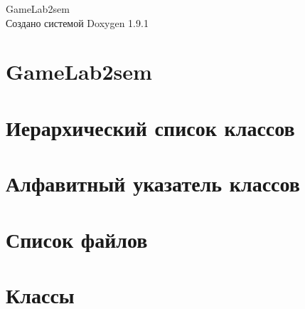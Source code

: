 \let\mypdfximage\pdfximage\def\pdfximage{\immediate\mypdfximage}\documentclass[twoside]{book}
\newcommand{\+}{\discretionary{\mbox{\scriptsize$\hookleftarrow$}}{}{}}
\newcommand{\clearemptydoublepage}{%
  \newpage{\pagestyle{empty}\cleardoublepage}%
}
\begin{document}
\raggedbottom

\hypersetup{pageanchor=false,
             bookmarksnumbered=true,
             pdfencoding=unicode
            }
\begin{titlepage}
\vspace*{7cm}
\begin{center}%
{\Large Game\+Lab2sem }\\
\vspace*{1cm}
{\large Создано системой Doxygen 1.9.1}\\
\end{center}
\end{titlepage}
\clearemptydoublepage
{}
\tableofcontents
\clearemptydoublepage
{}
\hypersetup{pageanchor=true}

\chapter{Game\+Lab2sem}
\label{index}\hypertarget{index}{}
\chapter{Иерархический список классов}

\chapter{Алфавитный указатель классов}

\chapter{Список файлов}

\chapter{Классы}






















\end{document}
